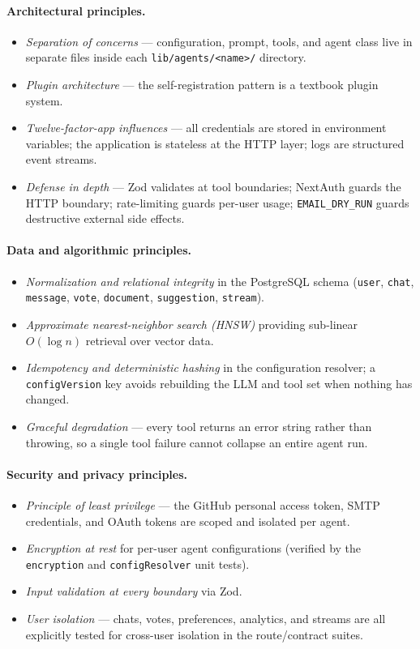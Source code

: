 \documentclass[11pt,a4paper]{report}
\newcommand{\code}[1]{\texttt{\small #1}}
\begin{document}
\paragraph{Architectural principles.}
\begin{itemize}
  \item \emph{Separation of concerns} --- configuration, prompt, tools, and agent class live in separate files inside each \code{lib/agents/<name>/} directory.
  \item \emph{Plugin architecture} --- the self-registration pattern is a textbook plugin system.
  \item \emph{Twelve-factor-app influences} --- all credentials are stored in environment variables; the application is stateless at the HTTP layer; logs are structured event streams.
  \item \emph{Defense in depth} --- Zod validates at tool boundaries; NextAuth guards the HTTP boundary; rate-limiting guards per-user usage; \code{EMAIL\_DRY\_RUN} guards destructive external side effects.
\end{itemize}

\paragraph{Data and algorithmic principles.}
\begin{itemize}
  \item \emph{Normalization and relational integrity} in the PostgreSQL schema (\code{user}, \code{chat}, \code{message}, \code{vote}, \code{document}, \code{suggestion}, \code{stream}).
  \item \emph{Approximate nearest-neighbor search (HNSW)} providing sub-linear $O(\log n)$ retrieval over vector data.
  \item \emph{Idempotency and deterministic hashing} in the configuration resolver; a \code{configVersion} key avoids rebuilding the LLM and tool set when nothing has changed.
  \item \emph{Graceful degradation} --- every tool returns an error string rather than throwing, so a single tool failure cannot collapse an entire agent run.
\end{itemize}

\paragraph{Security and privacy principles.}
\begin{itemize}
  \item \emph{Principle of least privilege} --- the GitHub personal access token, SMTP credentials, and OAuth tokens are scoped and isolated per agent.
  \item \emph{Encryption at rest} for per-user agent configurations (verified by the \code{encryption} and \code{configResolver} unit tests).
  \item \emph{Input validation at every boundary} via Zod.
  \item \emph{User isolation} --- chats, votes, preferences, analytics, and streams are all explicitly tested for cross-user isolation in the route/contract suites.
\end{itemize}
\end{document}
